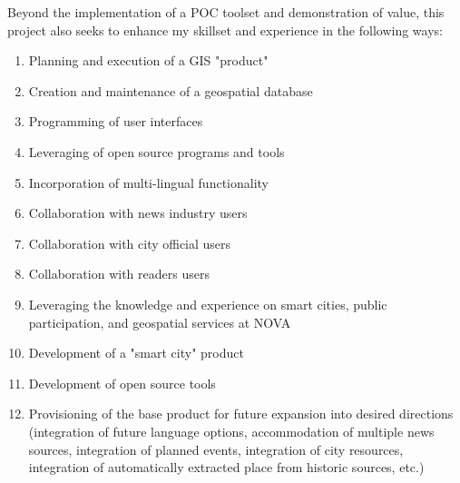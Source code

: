 Beyond the implementation of a POC toolset and demonstration of value, this project also seeks to enhance my skillset and experience in the following ways:
\begin{enumerate}
	\item Planning and execution of a GIS "product"
	\item Creation and maintenance of a geospatial database
	\item Programming of user interfaces
	\item Leveraging of open source programs and tools
	\item Incorporation of multi-lingual functionality
	\item Collaboration with news industry users
	\item Collaboration with city official users
	\item Collaboration with readers users
	\item Leveraging the knowledge and experience on smart cities, public participation, and geospatial services at NOVA
	\item Development of a "smart city" product
	\item Development of open source tools
	\item Provisioning of the base product for future expansion into desired directions (integration of future language options, accommodation of multiple news sources, integration of planned events, integration of city resources, integration of automatically extracted place from historic sources, etc.)
\end{enumerate}